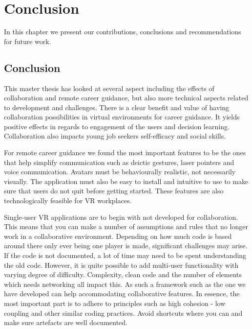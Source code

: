 
\chapter{Conclusion}
In this chapter we present our contributions, conclusions and recommendations for future work.





\section{Conclusion}
This master thesis has looked at several aspect including the effects of collaboration and remote career guidance, but also more technical aspects related to development and challenges. 
There is a clear benefit and value of having collaboration possibilities in virtual environments for career guidance. It yields positive effects in regards to engagement of the users and decision learning. Collaboration also impacts young job seekers self-efficacy and social skills. 

For remote career guidance we found the most important features to be the ones that help simplify communication such as deictic gestures, laser pointers and voice communication. Avatars must be behaviourally realistic, not necessarily visually. The application must also be easy to install and intuitive to use to make sure that users do not quit before getting started. These features are also technologically feasible for VR workplaces.

Single-user VR applications are to begin with not developed for collaboration. This means that you can make a number of assumptions and rules that no longer work in a collaborative environment. Depending on how much code is based around there only ever being one player is made, significant challenges may arise. If the code is not documented, a lot of time may need to be spent understanding the old code. However, it is quite possible to add multi-user functionality with varying degree of difficulty. Complexity, clean code and the number of elements which needs networking all impact this. As such a framework such as the one we have developed can help accommodating collaborative features. In essence, the most important part is to adhere to principles such as high cohesion - low coupling and other similar coding practices. Avoid shortcuts where you can and make sure artefacts are well documented.





